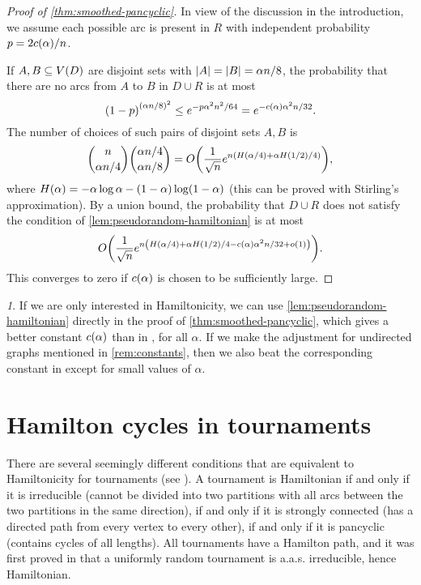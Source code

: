 \documentclass[11pt,english]{article}
\theoremstyle{plain}
\theoremstyle{definition}
\theoremstyle{definition}
\theoremstyle{plain}
\theoremstyle{plain}
\theoremstyle{plain}
\theoremstyle{plain}
\theoremstyle{remark}
\newtheorem{rem}[thm]{\protect\remarkname}
\theoremstyle{remark}
\let\originalleft\left
\let\originalright\right
\renewcommand{\left}{\mathopen{}\mathclose\bgroup\originalleft}
\renewcommand{\right}{\aftergroup\egroup\originalright}
\providecommand{\remarkname}{Remark}
\begin{document}
\begin{proof}
[Proof of \ref{thm:smoothed-pancyclic}]In view of the discussion
in the introduction, we assume each possible arc is present in $R$
with independent probability $p=2\cdi\left(\alpha\right)/n$.

If $A,B\subseteq V\left(D\right)$ are disjoint sets with $\left|A\right|=\left|B\right|=\alpha n/8$,
the probability that there are no arcs from $A$ to $B$ in $D\cup R$
is at most
\[
\left(1-p\right)^{\left(\alpha n/8\right)^{2}}\le e^{-p\alpha^{2}n^{2}/64}=e^{-\cdi\left(\alpha\right)\alpha^{2}n/32}.
\]
The number of choices of such pairs of disjoint sets $A,B$ is
\[
{n \choose \alpha n/4}{\alpha n/4 \choose \alpha n/8}=O\left(\frac{1}{\sqrt{n}}e^{n\left(H\left(\alpha/4\right)+\alpha H\left(1/2\right)/4\right)}\right),
\]
where $H\left(\alpha\right)=-\alpha\log\alpha-\left(1-\alpha\right)\log\left(1-\alpha\right)$
(this can be proved with Stirling's approximation). By a union bound,
the probability that $D\cup R$ does not satisfy the condition of
\ref{lem:pseudorandom-hamiltonian} is at most
\[
O\left(\frac{1}{\sqrt{n}}e^{n\left(H\left(\alpha/4\right)+\alpha H\left(1/2\right)/4-\cdi\left(\alpha\right)\alpha^{2}n/32+o\left(1\right)\right)}\right).
\]
This converges to zero if $\cdi\left(\alpha\right)$ is chosen to
be sufficiently large.\end{proof}
\begin{rem}
If we are only interested in Hamiltonicity, we can use \ref{lem:pseudorandom-hamiltonian}
directly in the proof of \ref{thm:smoothed-pancyclic}, which gives
a better constant $\cdi\left(\alpha\right)$ than in \cite[Theorem~3]{BFM03},
for all $\alpha$. If we make the adjustment for undirected graphs
mentioned in \ref{rem:constants}, then we also beat the corresponding
constant in \cite[Theorem~1]{BFM03} except for small values of $\alpha$.
\end{rem}

\section{\label{sec:tournaments}Hamilton cycles in tournaments}

There are several seemingly different conditions that are equivalent
to Hamiltonicity for tournaments (see \cite[Chapters~2-3]{Moo68}).
A tournament is Hamiltonian if and only if it is irreducible (cannot
be divided into two partitions with all arcs between the two partitions
in the same direction), if and only if it is strongly connected (has
a directed path from every vertex to every other), if and only if
it is pancyclic (contains cycles of all lengths). All tournaments
have a Hamilton path, and it was first proved in \cite{MM62} that
a uniformly random tournament is a.a.s. irreducible, hence Hamiltonian.
\end{document}
